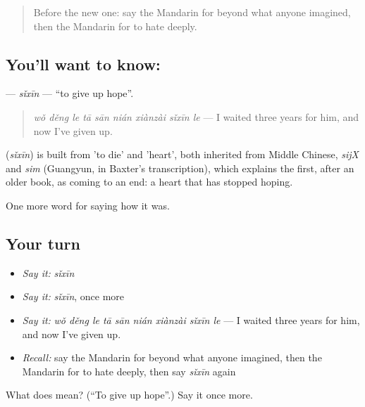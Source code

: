 \begin{quote}
Before the new one: say the Mandarin for beyond what anyone imagined, then the Mandarin for to hate deeply.
\end{quote}

\subsection*{You'll want to know: }
\textbf{} — \emph{sǐxīn} — \textquotedblleft{}to give up hope\textquotedblright{}.

\begin{quote}
\emph{wǒ děng le tā sān nián xiànzài sǐxīn le} — I waited three years for him, and now I've given up.
\end{quote}

\begin{cousinweb}
\textbf{} (\emph{sǐxīn}) is built from  'to die' and  'heart', both inherited from Middle Chinese, \emph{sijX} and \emph{sim} (Guangyun, in Baxter's transcription), which explains the first, after an older book, as coming to an end: a heart that has stopped hoping.
\end{cousinweb}

\begin{grammarlens}[title={What you've built}]
One more word for saying how it was.
\end{grammarlens}

\subsection*{Your turn}
\begin{itemize}
\raggedright
  \item \emph{Say it:} \emph{sǐxīn}
  \item \emph{Say it:} \emph{sǐxīn}, once more
  \item \emph{Say it:} \emph{wǒ děng le tā sān nián xiànzài sǐxīn le} — I waited three years for him, and now I've given up.
  \item \emph{Recall:} say the Mandarin for beyond what anyone imagined, then the Mandarin for to hate deeply, then say \emph{sǐxīn} again
\end{itemize}

\begin{tcolorbox}[breakable,colback=teal!4,colframe=teal!35!black,title={Before you move on}]
What does  mean? (\textquotedblleft{}To give up hope\textquotedblright{}.) Say it once more.
\end{tcolorbox}
